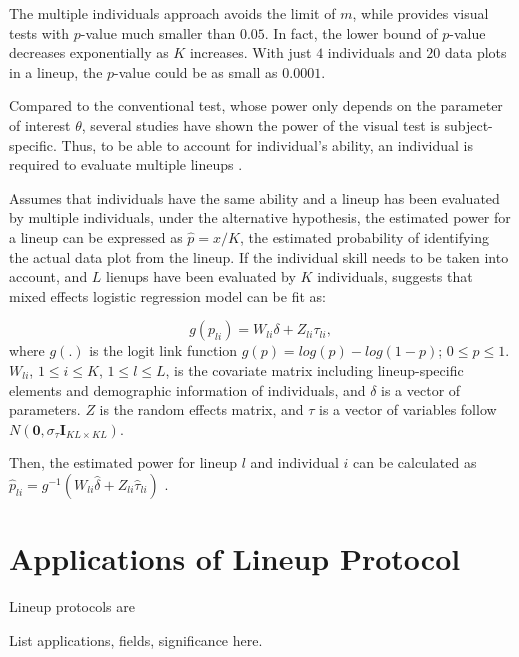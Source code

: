 \documentclass{monashthesis}
\begin{document}
The multiple individuals approach avoids the limit of \(m\), while provides visual tests with \(p\)-value much smaller than \(0.05\). In fact, the lower bound of \(p\)-value decreases exponentially as \(K\) increases. With just \(4\) individuals and \(20\) data plots in a lineup, the \(p\)-value could be as small as \(0.0001\).

Compared to the conventional test, whose power only depends on the parameter of interest \(\theta\), several studies \autocites[see][]{hofmann_graphical_2012,majumder_validation_2013,majumder_human_2014,roy_chowdhury_using_2015,loy_variations_2016} have shown the power of the visual test is subject-specific. Thus, to be able to account for individual's ability, an individual is required to evaluate multiple lineups \autocite{majumder_validation_2013}.

Assumes that individuals have the same ability and a lineup has been evaluated by multiple individuals, under the alternative hypothesis, the estimated power for a lineup can be expressed as \(\hat{p} = x/K\), the estimated probability of identifying the actual data plot from the lineup. If the individual skill needs to be taken into account, and \(L\) lienups have been evaluated by \(K\) individuals, \textcite{majumder_validation_2013} suggests that mixed effects logistic regression model can be fit as:

\[g(p_{li}) = W_{li}\delta + Z_{li}\tau_{li},\]
where \(g(.)\) is the logit link function \(g(p) = log(p) - log(1-p)\); \(0 \leq p \leq 1\). \(W_{li}\), \(1 \leq i \leq K\), \(1 \leq l \leq L\), is the covariate matrix including lineup-specific elements and demographic information of individuals, and \(\delta\) is a vector of parameters. \(Z\) is the random effects matrix, and \(\tau\) is a vector of variables follow \(N(\boldsymbol{0},\sigma_{\tau}\boldsymbol{I}_{KL\times KL})\).

Then, the estimated power for lineup \(l\) and individual \(i\) can be calculated as \(\hat{p}_{li} = g^{-1}(W_{li}\hat{\delta} + Z_{li}\hat{\tau}_{li})\) \autocite{majumder_validation_2013}.

\hypertarget{applications-of-lineup-protocol}{%
\section{Applications of Lineup Protocol}\label{applications-of-lineup-protocol}}

Lineup protocols are

List applications, fields, significance here.
\end{document}

